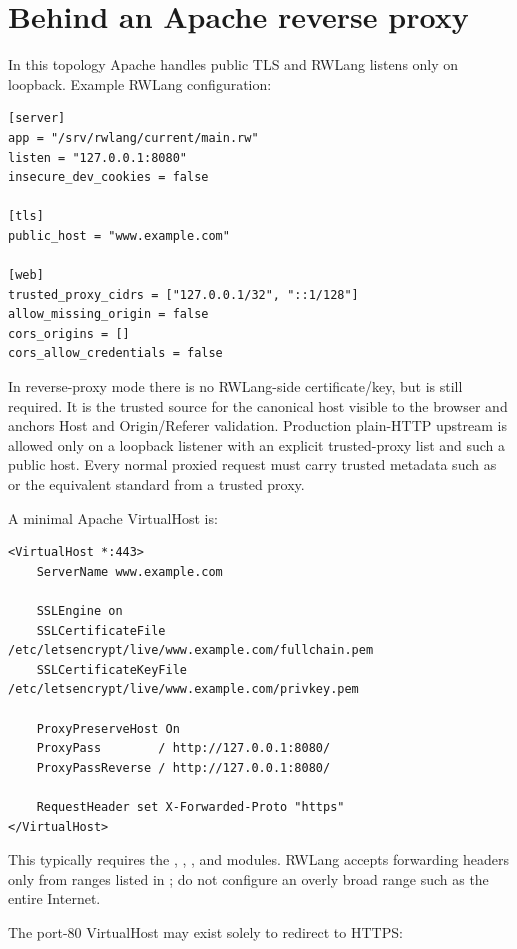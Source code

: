 \section{Behind an Apache reverse proxy}

In this topology Apache handles public TLS and RWLang listens only on loopback. Example RWLang configuration:

\begin{lstlisting}
[server]
app = "/srv/rwlang/current/main.rw"
listen = "127.0.0.1:8080"
insecure_dev_cookies = false

[tls]
public_host = "www.example.com"

[web]
trusted_proxy_cidrs = ["127.0.0.1/32", "::1/128"]
allow_missing_origin = false
cors_origins = []
cors_allow_credentials = false
\end{lstlisting}

In reverse-proxy mode there is no RWLang-side certificate/key, but  is still required. It is the trusted source for the canonical host visible to the browser and anchors Host and Origin/Referer validation. Production plain-HTTP upstream is allowed only on a loopback listener with an explicit trusted-proxy list and such a public host. Every normal proxied request must carry trusted metadata such as  or the equivalent standard  from a trusted proxy.

A minimal Apache VirtualHost is:

\begin{lstlisting}
<VirtualHost *:443>
    ServerName www.example.com

    SSLEngine on
    SSLCertificateFile /etc/letsencrypt/live/www.example.com/fullchain.pem
    SSLCertificateKeyFile /etc/letsencrypt/live/www.example.com/privkey.pem

    ProxyPreserveHost On
    ProxyPass        / http://127.0.0.1:8080/
    ProxyPassReverse / http://127.0.0.1:8080/

    RequestHeader set X-Forwarded-Proto "https"
</VirtualHost>
\end{lstlisting}

This typically requires the , , , and  modules. RWLang accepts forwarding headers only from ranges listed in ; do not configure an overly broad range such as the entire Internet.

The port-80 VirtualHost may exist solely to redirect to HTTPS:

